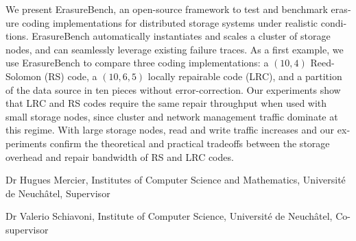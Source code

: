 \documentclass[10pt,conference]{IEEEtran}
\begin{document}
\begin{titlepage}
\begin{otherlanguage}{australian}
\bigskip

We present ErasureBench, an open-source framework to test and benchmark erasure coding implementations for distributed storage systems under realistic conditions. 
ErasureBench automatically instantiates and scales a cluster of storage nodes, and can seamlessly leverage existing failure traces.
As a first example, we use ErasureBench to compare three coding implementations: a $(10,4)$ Reed-Solomon (RS) code, a $(10,6,5)$ locally repairable code (LRC), and a partition of the data source in ten pieces without error-correction. 
Our experiments show that LRC and RS codes require the same repair throughput when used with small storage nodes, since cluster and network management traffic dominate at this regime. 
With large storage nodes, read and write traffic increases and our experiments confirm the theoretical and practical tradeoffs between the storage overhead and repair bandwidth of RS and LRC codes.

\bigskip

Dr Hugues Mercier, Institutes of Computer Science and Mathematics, Université de Neuchâtel, Supervisor

Dr Valerio Schiavoni, Institute of Computer Science, Université de Neuchâtel, Co-supervisor

    \end{otherlanguage}
\end{titlepage}


\pagebreak
\fi



\maketitle















\printbibliography
\end{document}
